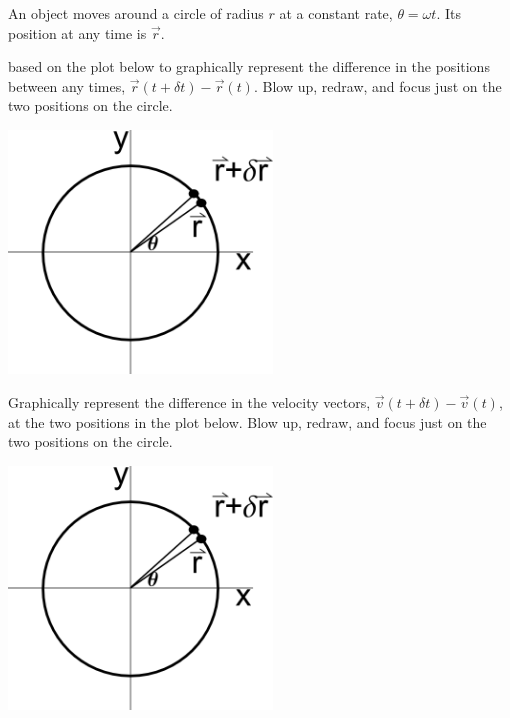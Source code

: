 \begin{problem}
\item An object moves around a circle of radius $r$  at a constant
  rate, $\theta=\omega t$. Its position at any time is $\vec{r}$.

  \begin{subproblem}
  \item based on the plot below to graphically represent the
    difference in the positions between any times, $\vec{r}(t+\delta
    t)-\vec{r}(t)$. Blow up, redraw, and focus just on the two
    positions on the circle.

    \includegraphics[width=7cm]{ink/week12/circularAcceleration}

  \item Graphically represent the difference in the velocity vectors,
    $\vec{v}(t+\delta t)-\vec{v}(t)$, at the two positions in the plot
    below. Blow up, redraw, and focus just on the two positions on the
    circle.

    \includegraphics[width=7cm]{ink/week12/circularAcceleration}
    \clearpage


\end{subproblem}
\end{problem}

